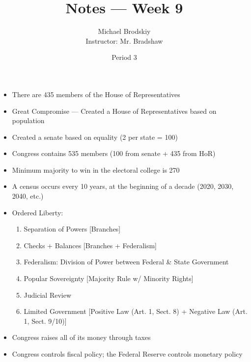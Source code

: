 \documentclass[12pt]{article}
\title{Notes — Week 9}
\date{Period 3}
\author{Michael Brodskiy\\ \small Instructor: Mr. Bradshaw}
\begin{document}
\maketitle

\begin{itemize}

  \item There are 435 members of the House of Representatives

  \item Great Compromise — Created a House of Representatives based on population

  \item Created a senate based on equality (2 per state = 100)

  \item Congress contains 535 members (100 from senate + 435 from HoR)

  \item Minimum majority to win in the electoral college is 270

  \item A census occurs every 10 years, at the beginning of a decade (2020, 2030, 2040, etc.)

  \item Ordered Liberty:

    \begin{enumerate}

      \item Separation of Powers [Branches]

      \item Checks + Balances [Branches + Federalism]

      \item Federalism: Division of Power between Federal \& State Government

      \item Popular Sovereignty [Majority Rule w/ Minority Rights]

      \item Judicial Review

      \item Limited Government [Positive Law (Art. 1, Sect. 8) + Negative Law (Art. 1, Sect. 9/10)]

    \end{enumerate}

  \item Congress raises all of its money through taxes

  \item Congress controls fiscal policy; the Federal Reserve controls monetary policy


\end{itemize}
\end{document}
